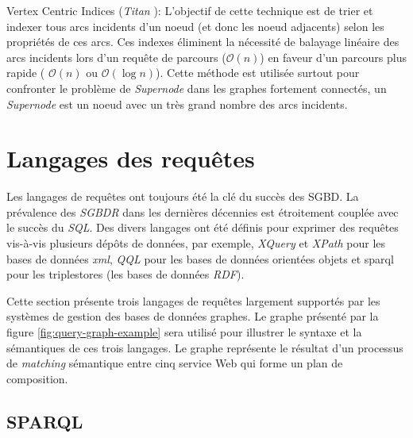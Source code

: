     Vertex Centric Indices (\emph{Titan} \cite{vertexci}): L'objectif
    de cette technique est de trier et indexer tous arcs incidents
    d'un noeud (et donc les noeud adjacents) selon les propriétés de
    ces arcs. Ces indexes éliminent la nécessité de balayage linéaire
    des arcs incidents lors d'un requête de parcours
    ($\mathcal{O}(n)$) en faveur d'un parcours plus rapide (
    $\mathcal{O}(n)$ ou $\mathcal{O}(\log{}n)$). Cette méthode est
    utilisée surtout pour confronter le problème de \emph{Supernode}
    dans les graphes fortement connectés, un \emph{Supernode} est un
    noeud avec un très grand nombre des arcs incidents.



\section{Langages des requêtes}
\label{sec:query-languages}
Les langages de requêtes ont toujours été la clé du succès des
\acrshort{SGBD}. La prévalence des \emph{\acrshort{SGBDR}} dans les
dernières décennies est étroitement couplée avec le succès du
\emph{SQL}. Des divers langages ont été définis pour exprimer des
requêtes vis-à-vis plusieurs dépôts de données, par exemple,
\emph{XQuery} \cite{boag2002xquery} et \emph{XPath}
\cite{clark1999xml} pour les bases de données \emph{\acrshort{xml}},
\emph{QQL} \cite{alashqur1989oql} pour les bases de données orientées
objets et \acrshort{sparql} \cite{prud2008sparql} pour les
triplestores (les bases de données \emph{RDF}).



Cette section présente trois langages de requêtes largement supportés
par les systèmes de gestion des bases de données graphes. Le graphe
présenté par la figure \ref{fig:query-graph-example} sera utilisé pour
illustrer le syntaxe et la sémantiques de ces trois langages. Le
graphe représente le résultat d'un processus de \emph{matching}
sémantique entre cinq service Web qui forme un plan de composition.


\newpage
  \subsection{SPARQL}
  \label{sec:sparql}

